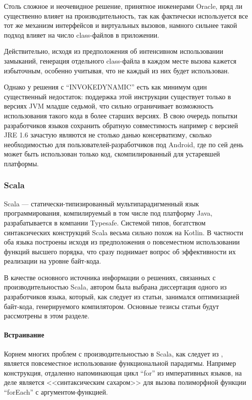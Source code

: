 Столь сложное и неочевидное решение, принятное инженерами Oracle, вряд ли существенно влияет на
производительность, так как фактически используется все тот же механизм интерфейсов и виртуальных
вызовов, намного сильнее такой подход влияет на число class-файлов в приложении.

Действительно, исходя из предположения об интенсивном использовании замыканий, генерация отдельного
class-файла в каждом месте вызова кажется избыточным, особенно учитывая, что не каждый из них
будет использован.

Однако у решения с ``INVOKEDYNAMIC'' есть как минимум один существенный недостаток: поддержка этой
инструкции существует только в версиях JVM младше седьмой, что сильно ограничивает возможность
использования такого кода в более старших версиях. В свою очередь попытки разработчиков языков
сохранить обратную совместимость например с версией JRE 1.6 зачастую являются не столько данью
консерватизму, сколько необходимостью для пользователей-разработчиков под Android, где по сей день
может быть использован только код, скомпилированный для устаревшей платформы.

\subsubsection{Scala}
\label{section:scala}
Scala --- статически-типизированный мультипарадигменный язык программирования, компилируемый
в том числе под платформу Java, разрабатывается в компании Typesafe.
Системой типов, богатством синтаксических конструкций Scala весьма сильно похож на Kotlin.
В частности оба языка построены исходя из предположения о повсеместном использовании
функций высшего порядка, что сразу поднимает вопрос об эффективности их реализации на уровне
байт-кода.

В качестве основного источника информации о решениях, связанных с производительностью Scala,
автором была выбрана диссертация\cite{ScalaDragos} одного из разработчиков языка,
который, как следует из статьи, занимался оптимизацией байт-кода, генерируемого компилятором.
Основные тезисы статьи будут рассмотрены в этом разделе.

\paragraph{Встраивание}
Корнем многих проблем с производительностью в Scala, как следует из \cite{ScalaDragos}, является
повсеместное использование функциональной парадигмы.
Например конструкция, отдаленно напоминающая цикл ``for'' из императивных языков, на деле является
<<синтаксическим сахаром>> для вызова полиморфной функции ``forEach'' с аргументом-функцией.

